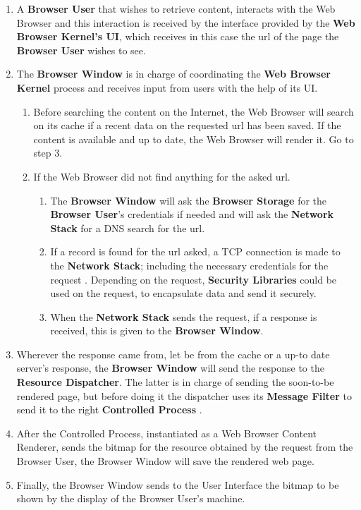 \documentclass[prodmode,hillsideplop]{acmlarge}
\begin{document}
\begin{enumerate}
	\item A \textbf{Browser User} that wishes to retrieve content, interacts with the Web Browser and this interaction is received by the interface provided by the \textbf{Web Browser Kernel's UI}, which receives in this case the url of the page the \textbf{Browser User} wishes to see.
    \item The \textbf{Browser Window} is in charge of coordinating the \textbf{Web Browser Kernel} process and receives input from users with the help of its UI.
    	\begin{enumerate}
    		\item  Before searching the content on the Internet, the Web Browser will search on its cache if a recent data on the requested url has been saved. If the content is available and up to date, the Web Browser will render it. Go to step 3.
            \item If the Web Browser did not find anything for the asked url.
              \begin{enumerate}
              	\item  The \textbf{Browser Window} will ask the \textbf{Browser Storage} for the \textbf{Browser User}’s credentials if needed and will ask the \textbf{Network Stack} for a DNS search for the url.
                \item If a record is found for the url asked, a TCP connection is made to the \textbf{Network Stack}; including the necessary credentials for the request . Depending on the request, \textbf{Security Libraries} could be used on the request, to encapsulate data and send it securely.
                \item When the \textbf{Network Stack} sends the request, if a response is received, this is given to the \textbf{Browser Window}.
              \end{enumerate}
    	\end{enumerate}
	\item Wherever the response came from, let be from the cache or a up-to date server’s response, the \textbf{Browser Window} will send the response to the \textbf{Resource Dispatcher}. The latter is in charge of sending the soon-to-be rendered page, but before doing it the dispatcher uses its \textbf{Message Filter} to send it to the right \textbf{Controlled Process} \cite{silva2015}.
    \item After the Controlled Process, instantiated as a Web Browser Content Renderer, sends the bitmap for the resource obtained by the request from the Browser User, the Browser Window will save the rendered web page.
    \item Finally, the Browser Window sends to the User Interface the bitmap to be shown by the display of the Browser User’s machine.

\end{enumerate}
\end{document}
